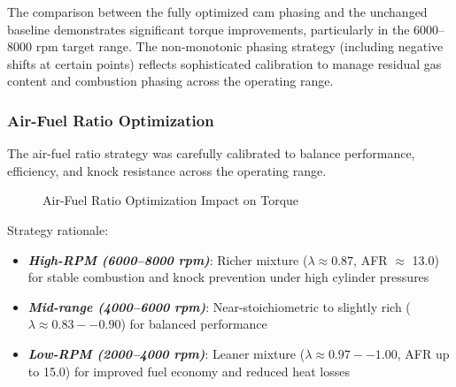 The comparison between the fully optimized cam phasing and the unchanged baseline demonstrates significant torque improvements, particularly in the 6000--8000 rpm target range. The non-monotonic phasing strategy (including negative shifts at certain points) reflects sophisticated calibration to manage residual gas content and combustion phasing across the operating range.

\subsubsection{Air-Fuel Ratio Optimization}

The air-fuel ratio strategy was carefully calibrated to balance performance, efficiency, and knock resistance across the operating range.

\begin{figure}[H]
    \centering
    \caption{Air-Fuel Ratio Optimization Impact on Torque}
    \label{fig:task2_af_optimization}
\end{figure}

Strategy rationale:
\begin{itemize}
    \item \textbf{\textit{High-RPM (6000--8000 rpm)}}: Richer mixture ($\lambda \approx 0.87$, AFR $\approx$ 13.0) for stable combustion and knock prevention under high cylinder pressures
    \item \textbf{\textit{Mid-range (4000--6000 rpm)}}: Near-stoichiometric to slightly rich ($\lambda \approx 0.83--0.90$) for balanced performance
    \item \textbf{\textit{Low-RPM (2000--4000 rpm)}}: Leaner mixture ($\lambda \approx 0.97--1.00$, AFR up to 15.0) for improved fuel economy and reduced heat losses
\end{itemize}

